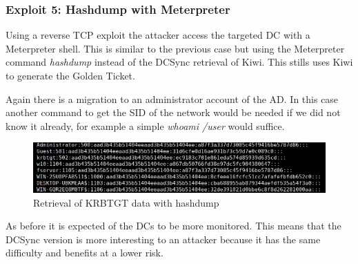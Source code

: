 \subsubsection{Exploit 5: Hashdump with Meterpreter}
Using a reverse TCP exploit the attacker access the targeted DC with a Meterpreter shell. This is similar to the previous case but using the Meterpreter command \textit{hashdump} instead of the DCSync retrieval of Kiwi\cite{pentestlab}. This stills uses Kiwi to generate the Golden Ticket.
\linej

\linej
Again there is a migration to an administrator account of the AD. In this case another command to get the SID of the network would be needed if we did not know it already, for example a simple \textit{whoami /user} would suffice.
\linej

\begin{figure}[H]
	\centering
	\includegraphics[width=\textwidth]{figuras/hashdump.png}
	\caption{Retrieval of KRBTGT data with hashdump}
\end{figure}
As before it is expected of the DCs to be more monitored. This means that the DCSync version is more interesting to an attacker because it has the same difficulty and benefits at a lower risk.

